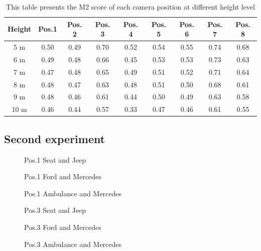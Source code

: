 \begin{table}[h]
\caption{This table presents the M2 score of each camera position at different height level \label{tab:height_experiment}}
\centering
    \begin{tabular}{ | c | c | c | c | c | c | c | c | c |}
    \hline
    Height & Pos.1 & Pos. 2 & Pos. 3 & Pos. 4 & Pos. 5 & Pos. 6 & Pos. 7 & Pos. 8 \\ \hline
    5 m & 0.50 & 0.49 & 0.70 & 0.52 & 0.54 & 0.55 & 0.74 & 0.68\\ \hline
    6 m & 0.49 & 0.48 & 0.66 & 0.45 & 0.53 & 0.53 & 0.73 & 0.63\\ \hline
    7 m & 0.47 & 0.48 & 0.65 & 0.49 & 0.51 & 0.52 & 0.71 & 0.64\\ \hline
    8 m & 0.48 & 0.47 & 0.63 & 0.48 & 0.51 & 0.50 & 0.68 & 0.61\\ \hline
    9 m & 0.48 & 0.46 & 0.61 & 0.44 & 0.50 & 0.49 & 0.63 & 0.58\\ \hline
    10 m & 0.46 & 0.44 & 0.57 & 0.33 & 0.47 & 0.46 & 0.61 & 0.55\\ \hline
    \end{tabular}
\end{table}

\newpage
\subsection{Second experiment}

\begin{figure}[!htb]
  
  \caption{Pos.1 Seat and Jeep}\label{fig:pos1_8m}
\endminipage\hfill
{}
  
  \caption{Pos.1 Ford and Mercedes}\label{fig:pos1_ford_merc}
\endminipage\hfill
\end{figure}


\begin{figure}[!htb]
  
  \caption{Pos.1 Ambulance and Mercedes}\label{fig:pos1_amb_merc}
\endminipage\hfill
{}
  
  \caption{Pos.3 Seat and Jeep}\label{fig:pos3_8m}
\endminipage\hfill
\end{figure}


\begin{figure}[!htb]
  
  \caption{Pos.3 Ford and Mercedes}\label{fig:pos3_ford_merc}
\endminipage\hfill
{}
  
  \caption{Pos.3 Ambulance and Mercedes}\label{fig:pos3_amb_merc}
\endminipage\hfill
\end{figure}


